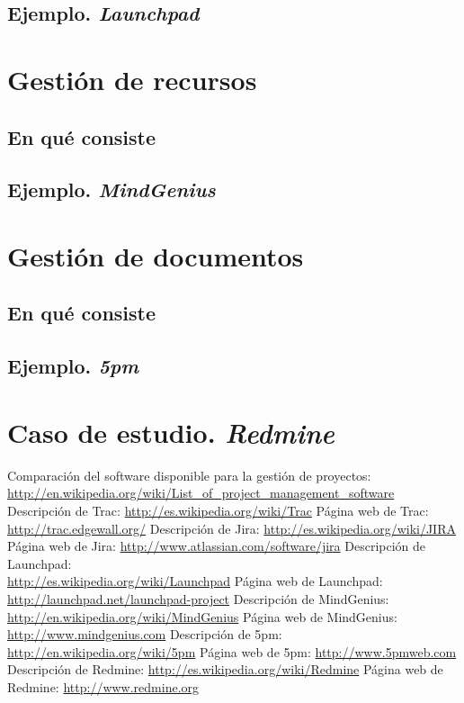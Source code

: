 \documentclass[11pt,a4paper,spanish,twoside]{report}
\begin{document}
\section{Ejemplo. \emph{Launchpad}}

\chapter{Gestión de recursos}
\section{En qué consiste}
\section{Ejemplo. \emph{MindGenius}}

\chapter{Gestión de documentos}
\section{En qué consiste}
\section{Ejemplo. \emph{5pm}}

\chapter{Caso de estudio. \emph{Redmine}}

\begin{thebibliography}{99}
 Comparación del software disponible para la gestión de proyectos:
\\ \url{http://en.wikipedia.org/wiki/List_of_project_management_software}
 Descripción de Trac:
  \url{http://es.wikipedia.org/wiki/Trac}
 Página web de Trac:
  \url{http://trac.edgewall.org/}
 Descripción de Jira:
  \url{http://es.wikipedia.org/wiki/JIRA}
 Página web de Jira:
  \url{http://www.atlassian.com/software/jira}
 Descripción de Launchpad:\\
  \url{http://es.wikipedia.org/wiki/Launchpad}
 Página web de Launchpad:\\
  \url{http://launchpad.net/launchpad-project}
 Descripción de MindGenius:\\
  \url{http://en.wikipedia.org/wiki/MindGenius}
 Página web de MindGenius:
  \url{http://www.mindgenius.com}
 Descripción de 5pm:
  \url{http://en.wikipedia.org/wiki/5pm}
 Página web de 5pm:
  \url{http://www.5pmweb.com}
 Descripción de Redmine:
  \url{http://es.wikipedia.org/wiki/Redmine}
 Página web de Redmine:
  \url{http://www.redmine.org}
\end{thebibliography}
% 
%
\end{document}
